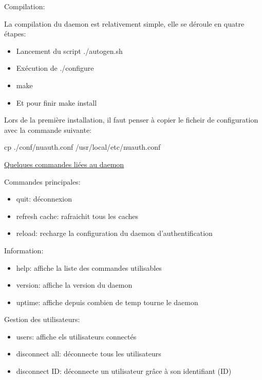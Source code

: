 \documentclass[12pt]{report}
\begin{document}
Compilation:

La compilation du daemon est relativement simple, elle se déroule en quatre étapes:
  \begin{itemize}
   \item Lancement du script ./autogen.sh
   \item Exécution de ./configure
   \item make
   \item Et pour finir make install
  \end{itemize}
Lors de la première installation, il faut penser à copier le ficheir de configuration avec la commande suivante:

cp ./conf/nuauth.conf /usr/local/etc/nuauth.conf

\underline{Quelques commandes liées au daemon}

Commandes principales:
\begin{itemize}
  \item quit: déconnexion
  \item refresh cache: rafraichit tous les caches
  \item reload: recharge la configuration du daemon d'authentification 
\end{itemize}
Information:
\begin{itemize}
  \item help: affiche la liste des commandes utilisables
  \item version: affiche la version du daemon
  \item uptime: affiche depuis combien de temp tourne le daemon 
\end{itemize}
Gestion des utilisateurs:
\begin{itemize}
  \item users: affiche els utilisateurs connectés
  \item disconnect all: déconnecte tous les utilisateurs
  \item disconnect ID: déconnecte un utilisateur grâce à son identifiant (ID) 
\end{itemize}

\end{document}
